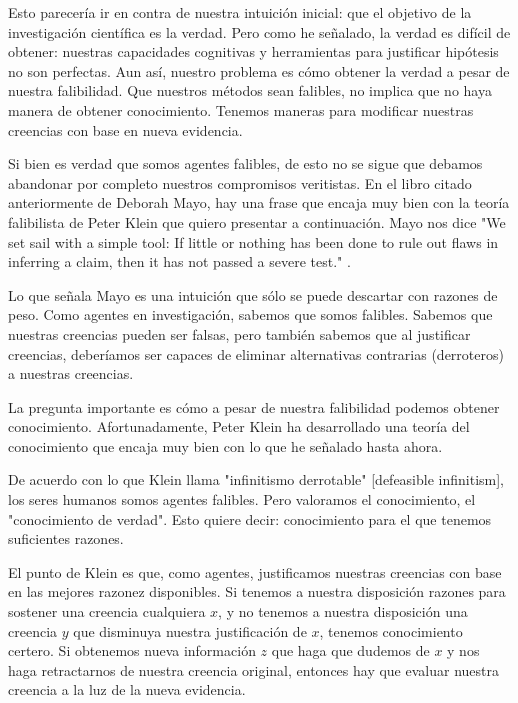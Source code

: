 Esto parecería ir en contra de nuestra intuición inicial: que el objetivo de la investigación científica es la verdad. 
Pero como he señalado, la verdad es difícil de obtener: nuestras capacidades cognitivas y herramientas para justificar hipótesis no son perfectas.
Aun así, nuestro problema es cómo obtener la verdad a pesar de nuestra falibilidad. 
Que nuestros métodos sean falibles, no implica que no haya manera de obtener conocimiento.
Tenemos maneras para modificar nuestras creencias con base en nueva evidencia.

Si bien es verdad que somos agentes falibles, de esto no se sigue que debamos abandonar por completo nuestros compromisos veritistas. 
En el libro citado anteriormente de Deborah Mayo, hay una frase que encaja muy bien con la teoría falibilista de Peter Klein \parencite{klein2019} que quiero presentar a continuación. 
Mayo nos dice "We set sail with a simple tool: If little or nothing has been done to rule out flaws in inferring a claim, then it has not passed a severe test." \parencite[][p. xii]{mayo2018}.

Lo que señala Mayo es una intuición que sólo se puede descartar con razones de peso. 
Como agentes en investigación, sabemos que somos falibles.
Sabemos que nuestras creencias pueden ser falsas, pero también sabemos que al justificar creencias, deberíamos ser capaces de eliminar alternativas contrarias (derroteros) a nuestras creencias.

La pregunta importante es cómo a pesar de nuestra falibilidad podemos obtener conocimiento. 
Afortunadamente, Peter Klein \parencite{klein2019} ha desarrollado una teoría del conocimiento que encaja muy bien con lo que he señalado hasta ahora.

De acuerdo con lo que Klein llama "infinitismo derrotable" [defeasible infinitism], los seres humanos somos agentes falibles.
Pero valoramos el conocimiento, el "conocimiento de verdad". 
Esto quiere decir: conocimiento para el que tenemos suficientes razones.

El punto de Klein es que, como agentes, justificamos nuestras creencias con base en las mejores razonez disponibles.
Si tenemos a nuestra disposición razones para sostener una creencia cualquiera $x$, y no tenemos a nuestra disposición una creencia $y$ que disminuya nuestra justificación de $x$, tenemos conocimiento certero.
Si obtenemos nueva información $z$ que haga que dudemos de $x$ y nos haga retractarnos de nuestra creencia original, entonces hay que evaluar nuestra creencia a la luz de la nueva evidencia.

